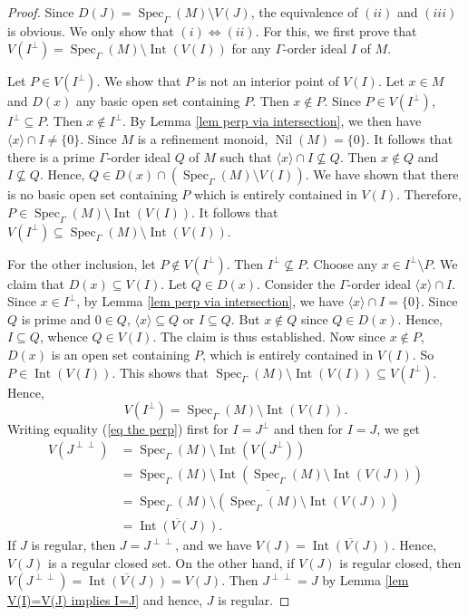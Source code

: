 \documentclass[a4paper,reqno,12pt]{amsart}
\numberwithin{equation}{section}
\theoremstyle{definition}
\theoremstyle{remark}
\newcommand{\nil}{\operatorname{Nil}}
\newcommand{\Spec}{\operatorname{Spec}}
\newcommand{\Int}{\operatorname{Int}}
\begin{document}
\begin{proof}
Since $D(J)=\Spec_\Gamma(M)\setminus V(J)$, the equivalence of $(ii)$ and $(iii)$ is obvious. We only show that $(i)\Leftrightarrow (ii)$. For this, we first prove that $V(I^\perp)=\Spec_\Gamma(M)\setminus \Int(V(I))$ for any $\Gamma$-order ideal $I$ of $M$.

Let $P\in V(I^\perp)$. We show that $P$ is not an interior point of $V(I)$. Let $x\in M$ and $D(x)$ any basic open set containing $P$. Then $x\notin P$. Since $P\in V(I^\perp)$, $I^\perp\subseteq P$. Then $x\notin I^\perp$. By Lemma \ref{lem perp via intersection}, we then have $\langle x\rangle \cap I\neq \{0\}$. Since $M$ is a refinement monoid, $\nil(M)=\{0\}$. It follows that there is a prime $\Gamma$-order ideal $Q$ of $M$ such that $\langle x\rangle \cap I\nsubseteq Q$. Then $x\notin Q$ and $I\nsubseteq Q$. Hence, $Q\in D(x)\cap (\Spec_\Gamma(M)\setminus V(I))$. We have shown that there is no basic open set containing $P$ which is entirely contained in $V(I)$. Therefore, $P\in \Spec_\Gamma(M)\setminus \Int(V(I))$. It follows that $V(I^\perp)\subseteq \Spec_\Gamma(M)\setminus \Int(V(I))$. 

For the other inclusion, let $P\notin V(I^\perp)$. Then $I^\perp \nsubseteq P$. Choose any $x\in I^\perp \setminus P$. We claim that $D(x)\subseteq V(I)$. Let $Q\in D(x)$. Consider the $\Gamma$-order ideal $\langle x\rangle \cap I$. Since $x\in I^\perp$, by Lemma \ref{lem perp via intersection}, we have $\langle x\rangle \cap I=\{0\}$. Since $Q$ is prime and $0\in Q$, $\langle x\rangle \subseteq Q$ or $I\subseteq Q$. But $x\notin Q$ since $Q\in D(x)$. Hence, $I\subseteq Q$, whence $Q\in V(I)$. The claim is thus established. Now since $x\notin P$, $D(x)$ is an open set containing $P$, which is entirely contained in $V(I)$. So $P\in \Int(V(I))$. This shows that $\Spec_\Gamma(M)\setminus \Int(V(I))\subseteq V(I^\perp)$. Hence, 
\begin{equation}\label{eq the perp}
V(I^\perp)=\Spec_\Gamma(M)\setminus \Int(V(I)).
\end{equation}
Writing equality (\ref{eq the perp}) first for $I=J^\perp$ and then for $I=J$, we get 
\begin{align*}
V(J^{\perp\perp})&=\Spec_\Gamma(M)\setminus \Int(V(J^\perp))\\
&=\Spec_\Gamma(M)\setminus \Int\left(\Spec_\Gamma(M)\setminus \Int(V(J))\right)\\
&=\overline{\Spec_\Gamma(M)\setminus \left(\Spec_\Gamma(M)\setminus \Int(V(J))\right)}\\
&=\overline{\Int(V(J))}.
\end{align*}
If $J$ is regular, then $J=J^{\perp \perp}$, and we have $V(J)=\overline{\Int(V(J))}$. Hence, $V(J)$ is a regular closed set. On the other hand, if $V(J)$ is regular closed, then $V(J^{\perp \perp})=\overline{\Int(V(J))}=V(J)$. Then $J^{\perp\perp}=J$ by Lemma \ref{lem V(I)=V(J) implies I=J} and hence, $J$ is regular. 


\end{proof}
\end{document}

